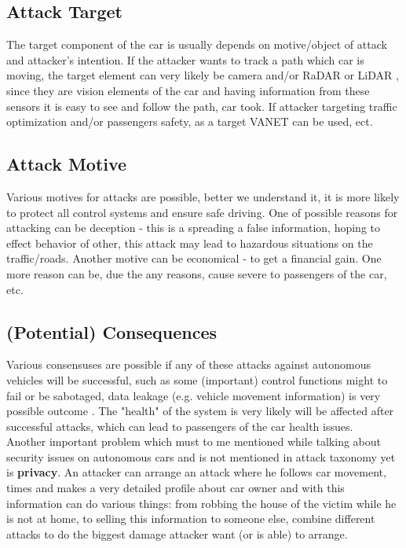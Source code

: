 \subsection{Attack Target}

The target component of the car is usually depends on motive/object of attack and attacker’s intention. If the attacker wants to track a path which car is moving, the target element can very likely be camera and/or \gls{RaDAR} or \gls{LiDAR} , since they are vision elements of the car and having information from these sensors it is easy to see and follow the path, car took. If attacker targeting traffic optimization and/or passengers safety, as a target \gls{VANET} can be used, ect.

\subsection{Attack Motive}

Various motives for attacks are possible, better we understand it, it is more likely to protect all control systems and ensure safe driving. One of possible reasons for attacking can be deception - this is a spreading a false information, hoping to effect behavior of other, this attack may lead to hazardous situations on the traffic/roads. Another motive can be economical - to get a financial gain. One more reason can be, due the any reasons, cause severe to passengers of the car, etc.

\subsection{(Potential) Consequences}

Various consensuses are possible if any of these attacks against autonomous vehicles will be successful, such as some (important) control functions might to fail or be sabotaged, data leakage (e.g. vehicle movement information) is very possible outcome \cite{sec, secsec}. The "health" of the system is very likely will be affected after successful attacks, which can lead to passengers of the car health issues. \\

Another important problem which must to me mentioned while talking about security issues on autonomous cars and is not mentioned in attack taxonomy yet is \textbf{privacy}. An attacker can arrange an attack where he follows car movement, times and makes a very detailed profile about car owner and with this information can do various things: from robbing the house of the victim while he is not at home, to selling this information to someone else, combine different attacks to do the biggest damage attacker want (or is able) to arrange.

